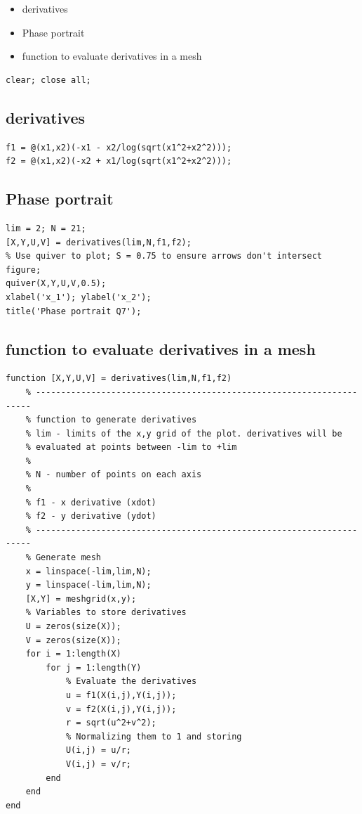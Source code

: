 \documentclass{article}
\begin{document}
\begin{itemize}
\setlength{\itemsep}{-1ex}
   \item derivatives
   \item Phase portrait
   \item function to evaluate derivatives in a mesh
\end{itemize}
\begin{verbatim}
clear; close all;
\end{verbatim}


\subsection*{derivatives}

\begin{verbatim}
f1 = @(x1,x2)(-x1 - x2/log(sqrt(x1^2+x2^2)));
f2 = @(x1,x2)(-x2 + x1/log(sqrt(x1^2+x2^2)));
\end{verbatim}


\subsection*{Phase portrait}

\begin{verbatim}
lim = 2; N = 21;
[X,Y,U,V] = derivatives(lim,N,f1,f2);
% Use quiver to plot; S = 0.75 to ensure arrows don't intersect
figure;
quiver(X,Y,U,V,0.5);
xlabel('x_1'); ylabel('x_2');
title('Phase portrait Q7');
\end{verbatim}


\subsection*{function to evaluate derivatives in a mesh}

\begin{verbatim}
function [X,Y,U,V] = derivatives(lim,N,f1,f2)
    % ---------------------------------------------------------------------
    % function to generate derivatives
    % lim - limits of the x,y grid of the plot. derivatives will be
    % evaluated at points between -lim to +lim
    %
    % N - number of points on each axis
    %
    % f1 - x derivative (xdot)
    % f2 - y derivative (ydot)
    % ---------------------------------------------------------------------
    % Generate mesh
    x = linspace(-lim,lim,N);
    y = linspace(-lim,lim,N);
    [X,Y] = meshgrid(x,y);
    % Variables to store derivatives
    U = zeros(size(X));
    V = zeros(size(X));
    for i = 1:length(X)
        for j = 1:length(Y)
            % Evaluate the derivatives
            u = f1(X(i,j),Y(i,j));
            v = f2(X(i,j),Y(i,j));
            r = sqrt(u^2+v^2);
            % Normalizing them to 1 and storing
            U(i,j) = u/r;
            V(i,j) = v/r;
        end
    end
end
\end{verbatim}
\end{document}
